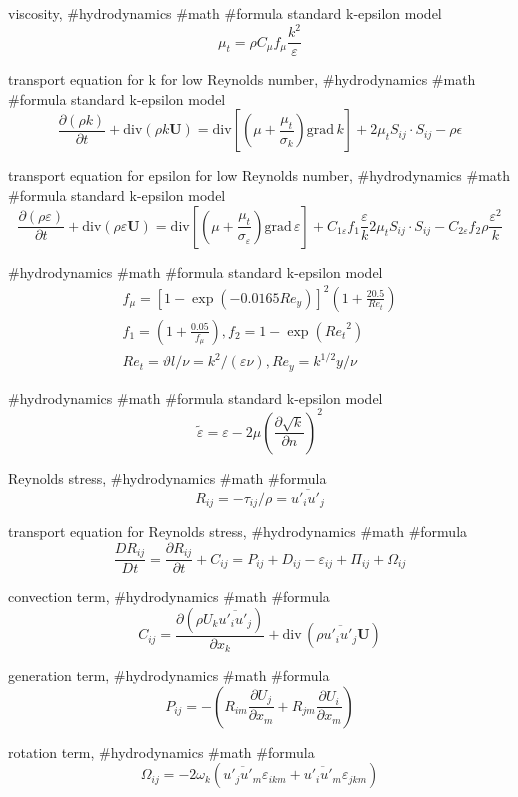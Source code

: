 viscosity, #hydrodynamics #math #formula
standard k-epsilon model
$$
\mu_t=\rho C_\mu f_\mu\frac{k^2}{\varepsilon}
$$

transport equation for k for low Reynolds number, #hydrodynamics #math #formula
standard k-epsilon model
$$
\frac{\partial(\rho k)}{\partial t}+\mathrm{div}(\rho k \boldsymbol{U})=\mathrm{div}\left[\left(\mu+\frac{\mu_t}{\sigma_k}\right)\mathrm{grad}\,k\right]+2\mu_t S_{ij}\cdot S_{ij}-\rho\epsilon
$$

transport equation for epsilon for low Reynolds number, #hydrodynamics #math #formula
standard k-epsilon model
$$
\frac{\partial(\rho \varepsilon)}{\partial t}+\mathrm{div}(\rho \varepsilon \boldsymbol{U})=\mathrm{div}\left[\left(\mu+\frac{\mu_t}{\sigma_\varepsilon}\right)\mathrm{grad}\,\varepsilon\right]+C_{1\varepsilon}f_1\frac{\varepsilon}{k}2\mu_t S_{ij}\cdot S_{ij}-C_{2\varepsilon}f_2\rho\frac{\varepsilon^2}{k}
$$

#hydrodynamics #math #formula
standard k-epsilon model
$$
\begin{array}{l}
f_\mu=[1-\exp(-0.0165{Re_y})]^2\left(1+\frac{20.5}{Re_t}\right) \\
f_1=\left(1+\frac{0.05}{f_\mu}\right), f_2=1-\exp({Re_t}^2) \\
{Re_t}=\vartheta l/\nu=k^2/(\varepsilon\nu), {Re_y}=k^{1/2}y/\nu
\end{array} 
$$

#hydrodynamics #math #formula
standard k-epsilon model
$$
\tilde{\varepsilon}=\varepsilon-2\mu\left(\frac{\partial \sqrt{k}}{\partial n}\right)^2
$$

Reynolds stress, #hydrodynamics #math #formula
$$
R_{ij}=-\tau_{ij}/\rho=\overline{u'_i u'_j}
$$

transport equation for Reynolds stress, #hydrodynamics #math #formula
$$
\frac{D R_{ij}}{Dt}=\frac{\partial R_{ij}}{\partial t}+C_{ij}=P_{ij}+D_{ij}-\varepsilon_{ij}+\Pi_{ij}+\Omega_{ij}
$$

convection term, #hydrodynamics #math #formula
$$
C_{ij}=\frac{\partial(\rho U_k\overline{u'_iu'_j})}{\partial x_k}+\mathrm{div}\,(\rho\overline{u'_iu'_j}\boldsymbol{U})
$$

generation term, #hydrodynamics #math #formula
$$
P_{ij}=-\left(R_{im}\frac{\partial U_j}{\partial x_m}+R_{jm}\frac{\partial U_i}{\partial x_m}\right)
$$

rotation term, #hydrodynamics #math #formula
$$
\Omega_{ij}=-2\omega_k(\overline{u'_ju'_m}\varepsilon_{ikm}+\overline{u'_iu'_m}\varepsilon_{jkm})
$$

